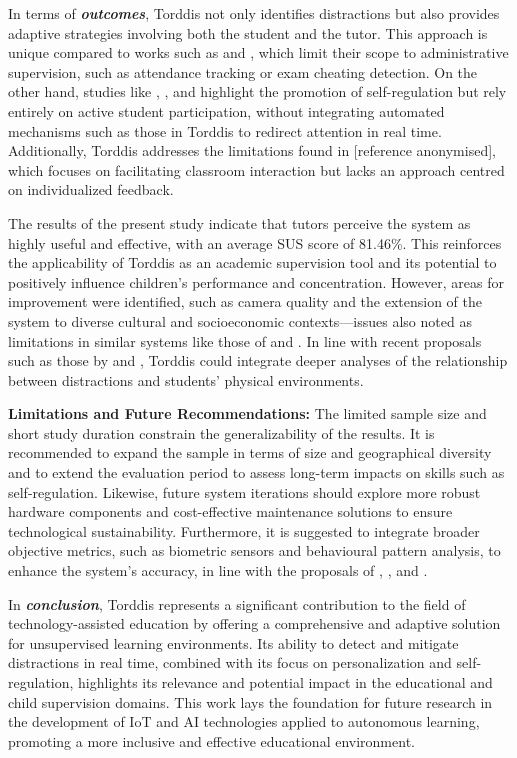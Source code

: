                 In terms of \textbf{\textit{outcomes}}, Torddis not only identifies distractions but also provides adaptive strategies involving both the student and the tutor. This approach is unique compared to works such as \cite{James2019} and \cite{Ozdamli2022}, which limit their scope to administrative supervision, such as attendance tracking or exam cheating detection. On the other hand, studies like \cite{Palmer2022impact}, \cite{Muljana2022Instructional}, and \cite{Hartley2022Smartphone} highlight the promotion of self-regulation but rely entirely on active student participation, without integrating automated mechanisms such as those in Torddis to redirect attention in real time. Additionally, Torddis addresses the limitations found in [reference anonymised], which focuses on facilitating classroom interaction but lacks an approach centred on individualized feedback.
                
                The results of the present study indicate that tutors perceive the system as highly useful and effective, with an average SUS score of 81.46\%. This reinforces the applicability of Torddis as an academic supervision tool and its potential to positively influence children's performance and concentration. However, areas for improvement were identified, such as camera quality and the extension of the system to diverse cultural and socioeconomic contexts—issues also noted as limitations in similar systems like those of \cite{Bembich2016Future} and \cite{Muljana2022Instructional}. In line with recent proposals such as those by \cite{Narkhede2023} and \cite{Ucar2022Recognizing}, Torddis could integrate deeper analyses of the relationship between distractions and students' physical environments.
                
                \textbf{Limitations and Future Recommendations:} The limited sample size and short study duration constrain the generalizability of the results. It is recommended to expand the sample in terms of size and geographical diversity and to extend the evaluation period to assess long-term impacts on skills such as self-regulation. Likewise, future system iterations should explore more robust hardware components and cost-effective maintenance solutions to ensure technological sustainability. Furthermore, it is suggested to integrate broader objective metrics, such as biometric sensors and behavioural pattern analysis, to enhance the system’s accuracy, in line with the proposals of \cite{VilliersRader2021}, \cite{Hachad2020}, and \cite{Ozdamli2022}.
                
                In \textbf{\textit{conclusion}}, Torddis represents a significant contribution to the field of technology-assisted education by offering a comprehensive and adaptive solution for unsupervised learning environments. Its ability to detect and mitigate distractions in real time, combined with its focus on personalization and self-regulation, highlights its relevance and potential impact in the educational and child supervision domains. This work lays the foundation for future research in the development of IoT and AI technologies applied to autonomous learning, promoting a more inclusive and effective educational environment.
                    			
